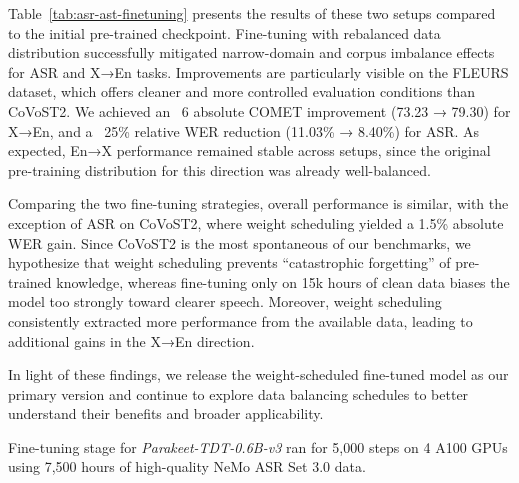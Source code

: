 Table~\ref{tab:asr-ast-finetuning} presents the results of these two setups compared to the initial pre-trained checkpoint. Fine-tuning with rebalanced data distribution successfully mitigated narrow-domain and corpus imbalance effects for ASR and X→En tasks. Improvements are particularly visible on the FLEURS dataset, which offers cleaner and more controlled evaluation conditions than CoVoST2. We achieved an ~6 absolute COMET improvement (73.23 → 79.30) for X→En, and a ~25\% relative WER reduction (11.03\% → 8.40\%) for ASR. As expected, En→X performance remained stable across setups, since the original pre-training distribution for this direction was already well-balanced.

Comparing the two fine-tuning strategies, overall performance is similar, with the exception of ASR on CoVoST2, where weight scheduling yielded a 1.5\% absolute WER gain. Since CoVoST2 is the most spontaneous of our benchmarks, we hypothesize that weight scheduling prevents “catastrophic forgetting” of pre-trained knowledge, whereas fine-tuning only on 15k hours of clean data biases the model too strongly toward clearer speech. Moreover, weight scheduling consistently extracted more performance from the available data, leading to additional gains in the X→En direction.

In light of these findings, we release the weight-scheduled fine-tuned model as our primary version and continue to explore data balancing schedules to better understand their benefits and broader applicability.


Fine-tuning stage for \emph{Parakeet-TDT-0.6B-v3} ran for 5,000 steps on 4 A100 GPUs using 7,500 hours of high-quality NeMo ASR Set 3.0 data.



